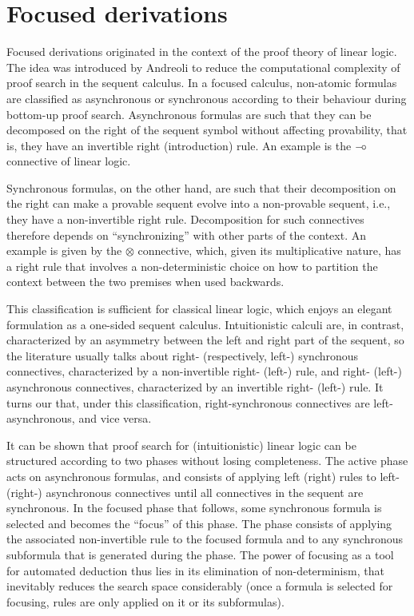 \section{Focused derivations}

Focused derivations originated in the context of the proof theory of linear
logic. The idea was introduced by Andreoli \cite{andreoli92} to reduce the
computational complexity of proof search in the sequent calculus.
In a focused calculus, non-atomic formulas are classified as asynchronous or
synchronous according to their behaviour during bottom-up proof search.
Asynchronous formulas are such that they can be decomposed on the right of the
sequent symbol without affecting provability, that is, they have an invertible
right (introduction) rule. An example is the $\mathbin{{-}\mkern-3.5mu{\circ}}$ connective of linear logic.

Synchronous formulas, on the other hand, are such that their decomposition on
the right can make a provable sequent evolve into a non-provable sequent, i.e.,
they have a non-invertible right rule. Decomposition for such connectives
therefore depends on ``synchronizing'' with other parts of the context.  An
example is given by the $\otimes$ connective, which, given its multiplicative
nature, has a right rule that involves a non-deterministic choice on how to
partition the context between the two premises when used backwards.

This classification is sufficient for classical linear logic, which enjoys an
elegant formulation as a one-sided sequent calculus.  Intuitionistic calculi
are, in contrast, characterized by an asymmetry between the left and right part
of the sequent, so the literature usually talks about right- (respectively,
left-) synchronous connectives, characterized by a non-invertible right- (left-)
rule, and right- (left-) asynchronous connectives, characterized by an
invertible right- (left-) rule.  It turns our that, under this classification,
right-synchronous connectives are left-asynchronous, and vice versa.

It can be shown that proof search for (intuitionistic) linear logic can be
structured according to two phases without losing completeness. The active phase
acts on asynchronous formulas, and consists of applying left (right) rules to
left- (right-) asynchronous connectives until all connectives in the sequent are
synchronous. In the focused phase that follows, some synchronous formula is
selected and becomes the ``focus'' of this phase. The phase consists of applying
the associated non-invertible rule to the focused formula and to any synchronous
subformula that is generated during the phase.  The power of focusing as a tool
for automated deduction thus lies in its elimination of non-determinism, that
inevitably reduces the search space considerably (once a formula is selected for
focusing, rules are only applied on it or its subformulas).

